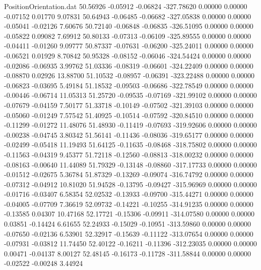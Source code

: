 \begin{filecontents}{PositionOrientation.dat}
  50.56926   -0.05912   -0.06824  -327.78620    0.00000    0.00000   -0.07152    0.01770    9.07831
  50.64943   -0.06485   -0.06682  -327.05838    0.00000    0.00000   -0.05041   -0.02126    7.60676
  50.72140   -0.06848   -0.06835  -326.51095    0.00000    0.00000   -0.05822    0.09082    7.69912
  50.80133   -0.07313   -0.06109  -325.89555    0.00000    0.00000   -0.04411   -0.01260    9.09777
  50.87337   -0.07631   -0.06200  -325.24011    0.00000    0.00000   -0.06521    0.01929    8.70842
  50.95328   -0.08152   -0.06046  -324.54424    0.00000    0.00000   -0.02086   -0.06935    3.99762
  51.03336   -0.08319   -0.06601  -324.22409    0.00000    0.00000   -0.08870    0.02926   13.88700
  51.10532   -0.08957   -0.06391  -323.22488    0.00000    0.00000   -0.06823   -0.03695    5.49184
  51.18532   -0.09503   -0.06686  -322.78549    0.00000    0.00000   -0.00446   -0.06714   11.05313
  51.25720   -0.09535   -0.07169  -321.99102    0.00000    0.00000   -0.07679   -0.04159    7.50177
  51.33718   -0.10149   -0.07502  -321.39103    0.00000    0.00000   -0.05060   -0.01249    7.57542
  51.40925   -0.10514   -0.07592  -320.84510    0.00000    0.00000   -0.11299   -0.01272   11.48076
  51.48930   -0.11419   -0.07693  -319.92606    0.00000    0.00000   -0.00238   -0.04745    3.80342
  51.56141   -0.11436   -0.08036  -319.65177    0.00000    0.00000   -0.02499   -0.05418   11.19493
  51.64125   -0.11635   -0.08468  -318.75802    0.00000    0.00000   -0.11563   -0.04319    9.45377
  51.72118   -0.12560   -0.08813  -318.00232    0.00000    0.00000   -0.08163   -0.00640   11.44089
  51.79329   -0.13148   -0.08860  -317.17733    0.00000    0.00000   -0.01512   -0.02675    5.36784
  51.87329   -0.13269   -0.09074  -316.74792    0.00000    0.00000   -0.07312   -0.04912   10.81020
  51.94528   -0.13795   -0.09427  -315.96969    0.00000    0.00000   -0.01716   -0.03407    6.58354
  52.02532   -0.13933   -0.09700  -315.44271    0.00000    0.00000   -0.04005   -0.07709    7.36619
  52.09732   -0.14221   -0.10255  -314.91235    0.00000    0.00000   -0.13585    0.04307   10.47168
  52.17721   -0.15306   -0.09911  -314.07580    0.00000    0.00000    0.03851   -0.14424    6.61655
  52.24933   -0.15029   -0.10951  -313.59860    0.00000    0.00000   -0.07650   -0.02136    6.53901
  52.32917   -0.15639   -0.11122  -313.07654    0.00000    0.00000   -0.07931   -0.03812   11.74450
  52.40122   -0.16211   -0.11396  -312.23035    0.00000    0.00000    0.00471   -0.04137    8.00127
  52.48145   -0.16173   -0.11728  -311.58844    0.00000    0.00000   -0.02522   -0.00248    3.44924

\end{filecontents}
